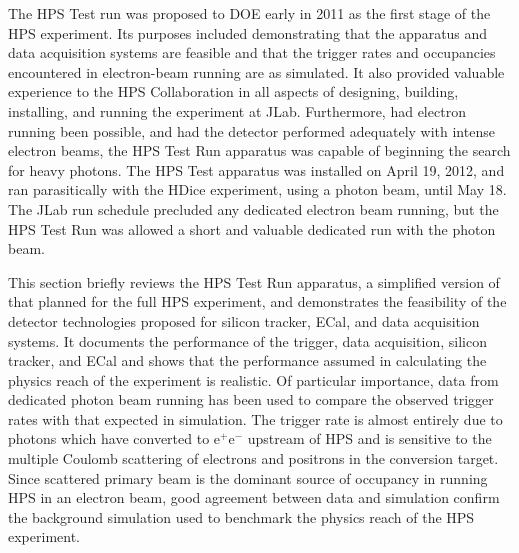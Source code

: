 The HPS Test run was proposed to DOE early in 2011 as the first stage of the HPS experiment. Its
purposes included demonstrating that the apparatus and data acquisition systems are feasible and
that the trigger rates and occupancies encountered in electron-beam running are as simulated.  It also
provided valuable experience to the HPS Collaboration in all aspects of designing, building, installing,
and running the experiment at JLab. 
Furthermore, had electron running been possible, and had the detector performed adequately with intense electron beams, 
the HPS Test Run apparatus was capable of beginning the search for heavy photons. 
The HPS Test apparatus was installed on April 19, 2012, and 
ran parasitically with the HDice experiment, using a photon beam, until May 18. The JLab run schedule 
precluded any dedicated electron beam running, but the HPS Test Run was allowed a short and valuable
dedicated run with the photon beam.

This section briefly reviews the HPS Test Run apparatus, a simplified version of that 
planned for the full HPS experiment, and demonstrates the feasibility of the detector
technologies proposed for silicon tracker, ECal, and data acquisition systems. It documents the
performance of the trigger, data acquisition, silicon tracker, and ECal
and shows that the performance assumed in calculating the physics reach of the experiment is realistic.
Of particular importance, data from dedicated photon beam running has been used to compare
the observed trigger rates with that expected in simulation. The trigger rate is almost entirely due to
photons which have converted to e$^+$e$^-$ upstream of HPS and is sensitive to the multiple
Coulomb scattering of electrons and positrons in the conversion target.  Since scattered primary beam is the dominant 
source of occupancy in running HPS in an electron beam, good agreement between data and simulation 
confirm the background simulation used to benchmark the physics reach of the HPS experiment. 

